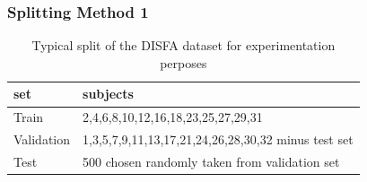       \subsubsection{Splitting Method 1} \label{sec:splitting}
        \begin{table}[h!]
          \centering
          \begin{tabular}{|l|l|}
          \hline
          set & subjects   \\
          \hline
           Train          & 2,4,6,8,10,12,16,18,23,25,27,29,31      \\
          \hline
          Validation      & 1,3,5,7,9,11,13,17,21,24,26,28,30,32 minus test set     \\
          \hline
          Test           & 500 chosen randomly taken from validation set      \\
         \hline
          \end{tabular}
          \caption{Typical split of the DISFA dataset for experimentation perposes}
          \label{sec:splitting}
        \end{table}
